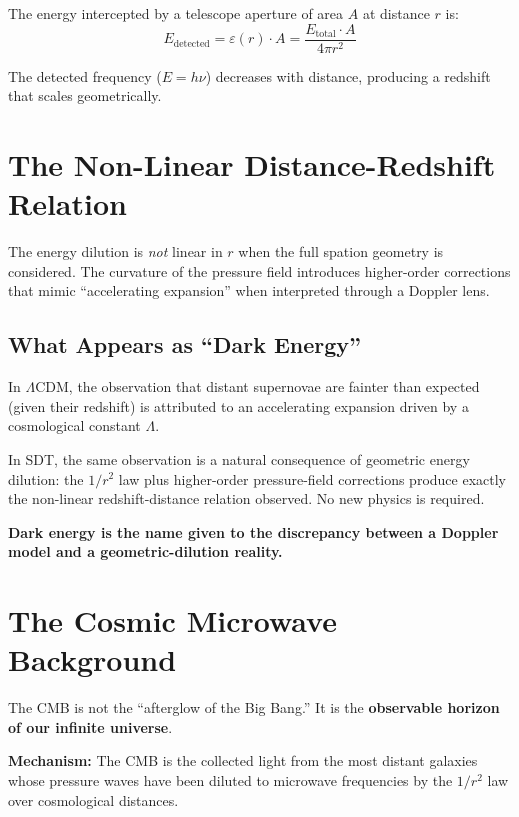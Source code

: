 The energy intercepted by a telescope aperture of area $A$ at distance $r$ is:
\begin{equation}
  E_{\text{detected}} = \varepsilon(r) \cdot A = \frac{E_{\text{total}} \cdot A}{4\pi r^2}
\end{equation}

The detected frequency ($E = h\nu$) decreases with distance, producing a redshift that scales geometrically.


\section{The Non-Linear Distance-Redshift Relation}

The energy dilution is \emph{not} linear in $r$ when the full spation geometry is considered.  The curvature of the pressure field introduces higher-order corrections that mimic ``accelerating expansion'' when interpreted through a Doppler lens.

\subsection{What Appears as ``Dark Energy''}

In $\Lambda$CDM, the observation that distant supernovae are fainter than expected (given their redshift) is attributed to an accelerating expansion driven by a cosmological constant $\Lambda$.

In SDT, the same observation is a natural consequence of geometric energy dilution: the $1/r^2$ law plus higher-order pressure-field corrections produce exactly the non-linear redshift-distance relation observed.  No new physics is required.

\textbf{Dark energy is the name given to the discrepancy between a Doppler model and a geometric-dilution reality.}


\section{The Cosmic Microwave Background}

The CMB is not the ``afterglow of the Big Bang.''  It is the \textbf{observable horizon of our infinite universe}.

\textbf{Mechanism:} The CMB is the collected light from the most distant galaxies whose pressure waves have been diluted to microwave frequencies by the $1/r^2$ law over cosmological distances.


